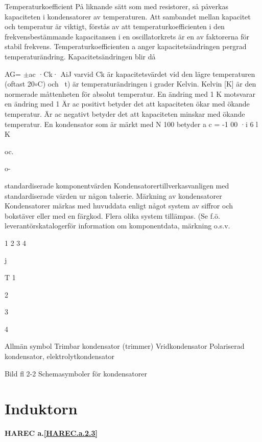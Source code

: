 Temperaturkoefficient
På liknande sätt som med resistorer, så
påverkas kapaciteten i kondensatorer av
temperaturen. Att sambandet mellan kapacitet och temperatur är viktigt, förstås av att
temperaturkoefficienten i den frekvensbestämmande kapacitansen i en oscillatorkrets
är en av faktorerna för stabil frekvens.
Temperaturkoefficienten a anger kapacitetsändringen pergrad temperaturändring.
Kapacitetsändringen blir då

AG= \(\pm\)ac ·Ck· AiJ
varvid Ck är kapacitetsvärdet vid den lägre
temperaturen (oftast 20\(\circ\)C) och ~t) är
temperaturändringen i grader Kelvin.
Kelvin [K] är den normerade måttenheten
för absolut temperatur.
En ändring med 1 K motsvarar en ändring med 1
Är ac positivt betyder det att kapaciteten
ökar med ökande temperatur.
Är ac negativt betyder det att kapaciteten
minskar med ökande temperatur.
En kondensator som är märkt med N 100
betyder a c = -1 00 ·i 6 l K

oc.

o-

standardiserade komponentvärden
Kondensatorertillverkasvanligen med standardiserade värden ur någon talserie.
Märkning av kondensatorer
Kondensatorer märkas med huvuddata enligt något system av siffror och bokstäver
eller med en färgkod. Flera olika system
tillämpas.
(Se f.ö. leverantörskatalogerför information
om komponentdata, märkning o.s.v.

1
2
3
4

j

T
1

2

3

4

Allmän symbol
Trimbar kondensator (trimmer)
Vridkondensator
Polariserad kondensator,
elektrolytkondensator

Bild fl 2-2 Schemasymboler för kondensatorer

\section{Induktorn}
\textbf{HAREC a.\ref{HAREC.a.2.3}\label{myHAREC.a.2.3}}


